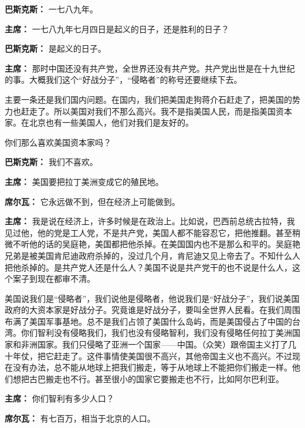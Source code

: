 \begin{duihua}
\item[\textbf{巴斯克斯：}] 一七八九年。

\item[\textbf{主席：}] 一七八九年七月四日是起义的日子，还是胜利的日子？

\item[\textbf{巴斯克斯：}] 是起义的日子。

\item[\textbf{主席：}] 那时中国还没有共产党，全世界还没有共产党。共产党出世是在十九世纪的事。大概我们这个“好战分子”，“侵略者”的称号还要继续下去。

主要一条还是我们国内问题。在国内，我们把美国走狗蒋介石赶走了，把美国的势力也赶走了。所以美国对我们不那么高兴。我不是指美国人民，而是指美国资本家。在北京也有一些美国人，他们对我们是友好的。

你们那么喜欢美国资本家吗？

\item[\textbf{巴斯克斯：}] 我们不喜欢。

\item[\textbf{主席：}] 美国要把拉丁美洲变成它的殖民地。

\item[\textbf{席尔瓦：}] 它永远做不到，但在经济上可能做到。

\item[\textbf{主席：}] 我是说在经济上，许多时候是在政治上。比如说，巴西前总统古拉特，我见过他，他的党是工人党，不是共产党，美国人都不能容忍它，把他推翻。甚至稍微不听他的话的吴庭艳，美国都把他杀掉。在美国国内也不是那么和平的。吴庭艳兄弟是被美国肯尼迪政府杀掉的，没过几个月，肯尼迪又见上帝去了。不知什么人把他杀掉的。是共产党人还是什么人？美国不说是共产党干的也不说是什么人，这个案子到现在都审不清。

美国说我们是“侵略者”，我们说他是侵略者，他说我们是“好战分子”，我们说美国政府的大资本家是好战分子。究竟谁是好战分子，要叫全世界人民看。在我们周围布满了美国军事基地。总不是我们占领了美国什么岛屿，而是美国侵占了中国的台湾。你们智利没有侵略我们，我们也没有侵略智利，我们没有侵略任何拉丁美洲国家和非洲国家。我们只侵略了亚洲一个国家——中国。（众笑）跟帝国主义打了几十年仗，把它赶走了。这件事情使美国很不高兴，其他帝国主义也不高兴。不过现在没有办法，总不能从地球上把我们搬走，等于从地球上不能把你们搬走一样。他们想把古巴搬走也不行。甚至很小的国家它要搬走也不行，比如阿尔巴利亚。

\item[\textbf{主席：}] 你们智利有多少人口？

\item[\textbf{席尔瓦：}] 有七百万，相当于北京的人口。


\end{duihua}
